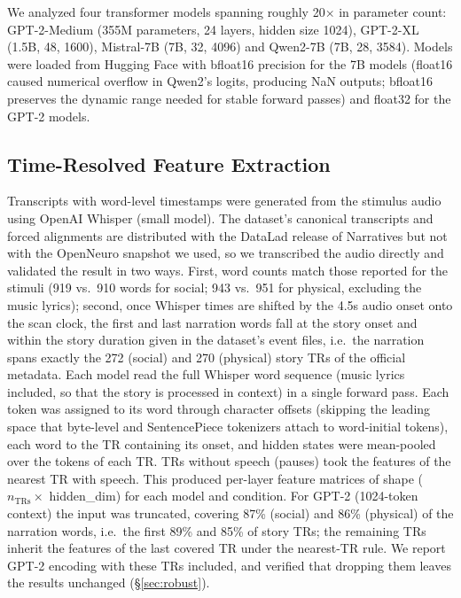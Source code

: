 \documentclass[conference]{IEEEtran}
\begin{document}
We analyzed four transformer models spanning roughly 20$\times$ in parameter count: GPT-2-Medium (355M parameters, 24 layers, hidden size 1024), GPT-2-XL (1.5B, 48, 1600), Mistral-7B (7B, 32, 4096) and Qwen2-7B (7B, 28, 3584). Models were loaded from Hugging Face \cite{wolf2020transformers} with bfloat16 precision for the 7B models (float16 caused numerical overflow in Qwen2's logits, producing NaN outputs; bfloat16 preserves the dynamic range needed for stable forward passes) and float32 for the GPT-2 models.


\subsection{Time-Resolved Feature Extraction}
\label{sec:methods:features}

Transcripts with word-level timestamps were generated from the stimulus audio using OpenAI Whisper (small model). The dataset's canonical transcripts and forced alignments are distributed with the DataLad release of Narratives but not with the OpenNeuro snapshot we used, so we transcribed the audio directly and validated the result in two ways. First, word counts match those reported for the stimuli \cite{nastase2021narratives} (919 vs.\ 910 words for social; 943 vs.\ 951 for physical, excluding the music lyrics); second, once Whisper times are shifted by the 4.5s audio onset onto the scan clock, the first and last narration words fall at the story onset and within the story duration given in the dataset's event files, i.e.\ the narration spans exactly the 272 (social) and 270 (physical) story TRs of the official metadata. Each model read the full Whisper word sequence (music lyrics included, so that the story is processed in context) in a single forward pass. Each token was assigned to its word through character offsets (skipping the leading space that byte-level and SentencePiece tokenizers attach to word-initial tokens), each word to the TR containing its onset, and hidden states were mean-pooled over the tokens of each TR. TRs without speech (pauses) took the features of the nearest TR with speech. This produced per-layer feature matrices of shape ($n_{\text{TRs}} \times$ hidden\_dim) for each model and condition. For GPT-2 (1024-token context) the input was truncated, covering 87\% (social) and 86\% (physical) of the narration words, i.e.\ the first 89\% and 85\% of story TRs; the remaining TRs inherit the features of the last covered TR under the nearest-TR rule. We report GPT-2 encoding with these TRs included, and verified that dropping them leaves the results unchanged (\S\ref{sec:robust}).
\end{document}
